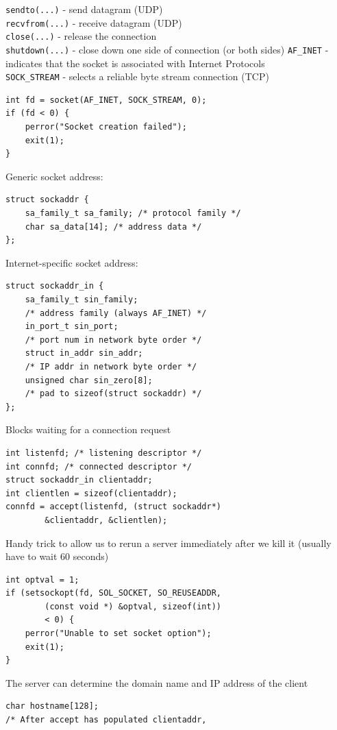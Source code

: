 \documentclass[number]{notes}
\begin{document}
\begin{landscape}
\begin{multicols}{3}
\texttt{sendto(...)} - send datagram (UDP)\\
\texttt{recvfrom(...)} - receive datagram (UDP)\\
\texttt{close(...)} - release the connection\\
\texttt{shutdown(...)} - close down one side of connection (or both sides)
\texttt{AF\_INET} - indicates that the socket is associated with Internet Protocols\\
\texttt{SOCK\_STREAM} - selects a reliable byte stream connection (TCP)
\begin{lstlisting}
int fd = socket(AF_INET, SOCK_STREAM, 0);
if (fd < 0) {
    perror("Socket creation failed");
    exit(1);
}
\end{lstlisting}
Generic socket address:
\begin{lstlisting}
struct sockaddr {
    sa_family_t sa_family; /* protocol family */
    char sa_data[14]; /* address data */
};
\end{lstlisting}
Internet-specific socket address:
\begin{lstlisting}
struct sockaddr_in {
    sa_family_t sin_family;
    /* address family (always AF_INET) */
    in_port_t sin_port;
    /* port num in network byte order */
    struct in_addr sin_addr;
    /* IP addr in network byte order */
    unsigned char sin_zero[8];
    /* pad to sizeof(struct sockaddr) */
};
\end{lstlisting}
Blocks waiting for a connection request
\begin{lstlisting}
int listenfd; /* listening descriptor */
int connfd; /* connected descriptor */
struct sockaddr_in clientaddr;
int clientlen = sizeof(clientaddr);
connfd = accept(listenfd, (struct sockaddr*)
        &clientaddr, &clientlen);
\end{lstlisting}
Handy trick to allow us to rerun a server immediately after we kill it (usually have to wait 60 seconds)
\begin{lstlisting}
int optval = 1;
if (setsockopt(fd, SOL_SOCKET, SO_REUSEADDR,
        (const void *) &optval, sizeof(int))
        < 0) {
    perror("Unable to set socket option");
    exit(1);
}
\end{lstlisting}
The server can determine the domain name and IP address of the client
\begin{lstlisting}
char hostname[128];
/* After accept has populated clientaddr,

\end{lstlisting}
\end{multicols}
\end{landscape}
\end{document}
